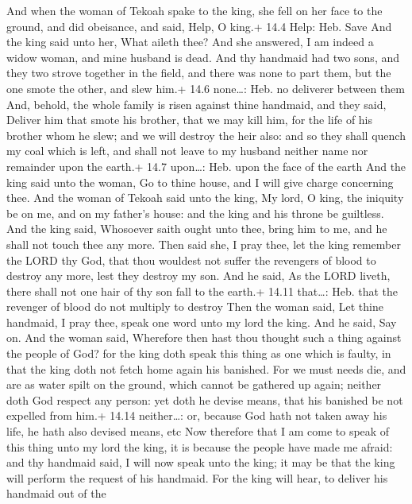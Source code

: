  And when the woman of Tekoah spake to the king, she fell
on her face to the ground, and did obeisance, and said, Help, O king.+
14.4 Help: Heb. Save  And the king said unto her, What
aileth thee? And she answered, I am indeed a widow woman, and mine
husband is dead.  And thy handmaid had two sons, and they
two strove together in the field, and there was none to part them, but
the one smote the other, and slew him.+ 14.6 none\ldots: Heb. no
deliverer between them  And, behold, the whole family is
risen against thine handmaid, and they said, Deliver him that smote his
brother, that we may kill him, for the life of his brother whom he slew;
and we will destroy the heir also: and so they shall quench my coal
which is left, and shall not leave to my husband neither name nor
remainder upon the earth.+ 14.7 upon\ldots: Heb. upon the face of the
earth  And the king said unto the woman, Go to thine house,
and I will give charge concerning thee.  And the woman of
Tekoah said unto the king, My lord, O king, the iniquity be on me, and
on my father's house: and the king and his throne be guiltless.
 And the king said, Whosoever saith ought unto thee, bring
him to me, and he shall not touch thee any more.  Then said
she, I pray thee, let the king remember the LORD thy God, that thou
wouldest not suffer the revengers of blood to destroy any more, lest
they destroy my son. And he said, As the LORD liveth, there shall not
one hair of thy son fall to the earth.+ 14.11 that\ldots: Heb. that the
revenger of blood do not multiply to destroy  Then the
woman said, Let thine handmaid, I pray thee, speak one word unto my lord
the king. And he said, Say on.  And the woman said,
Wherefore then hast thou thought such a thing against the people of God?
for the king doth speak this thing as one which is faulty, in that the
king doth not fetch home again his banished.  For we must
needs die, and are as water spilt on the ground, which cannot be
gathered up again; neither doth God respect any person: yet doth he
devise means, that his banished be not expelled from him.+ 14.14
neither\ldots: or, because God hath not taken away his life, he hath
also devised means, etc  Now therefore that I am come to
speak of this thing unto my lord the king, it is because the people have
made me afraid: and thy handmaid said, I will now speak unto the king;
it may be that the king will perform the request of his handmaid.
 For the king will hear, to deliver his handmaid out of the
